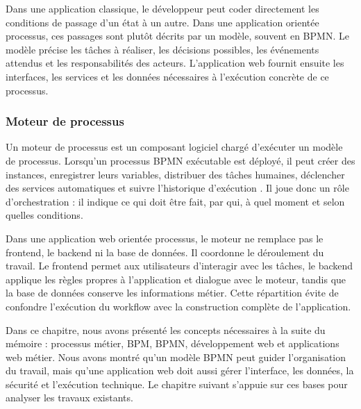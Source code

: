 Dans une application classique, le développeur peut coder directement les
conditions de passage d'un état à un autre. Dans une application orientée
processus, ces passages sont plutôt décrits par un modèle, souvent en BPMN. Le
modèle précise les tâches à réaliser, les décisions possibles, les événements
attendus et les responsabilités des acteurs. L'application web fournit ensuite
les interfaces, les services et les données nécessaires à l'exécution concrète
de ce processus.


\subsubsection{Moteur de processus}

Un moteur de processus est un composant logiciel chargé d'exécuter un modèle de
processus. Lorsqu'un processus BPMN exécutable est déployé, il peut créer des
instances, enregistrer leurs variables, distribuer des tâches humaines,
déclencher des services automatiques et suivre l'historique d'exécution
\cite{camunda2026modeler}. Il joue donc un rôle d'orchestration : il indique ce
qui doit être fait, par qui, à quel moment et selon quelles conditions.

Dans une application web orientée processus, le moteur ne remplace pas le
frontend, le backend ni la base de données. Il coordonne le déroulement du
travail. Le frontend permet aux utilisateurs d'interagir avec les tâches, le
backend applique les règles propres à l'application et dialogue avec le moteur,
tandis que la base de données conserve les informations métier. Cette
répartition évite de confondre l'exécution du workflow avec la construction
complète de l'application.


Dans ce chapitre, nous avons présenté les concepts nécessaires à la suite du
mémoire : processus métier, BPM, BPMN, développement web et applications web
métier. Nous avons montré qu'un modèle BPMN peut guider
l'organisation du travail, mais qu'une application web doit aussi gérer
l'interface, les données, la sécurité et l'exécution technique. Le chapitre
suivant s'appuie sur ces bases pour analyser les travaux existants.
